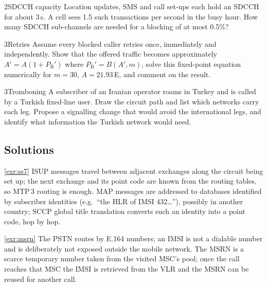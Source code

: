\documentclass[11pt,a4paper]{article}
\begin{document}
\begin{exercisebox}{2}{SDCCH capacity}\label{exr:sdcch}
Location updates, SMS and call set-ups each hold an SDCCH for about 3\,s. A cell sees 1.5
such transactions per second in the busy hour. How many SDCCH sub-channels are needed for
a blocking of at most 0.5\%?
\end{exercisebox}

\begin{exercisebox}{3}{Retries}\label{exr:retry}
Assume every blocked caller retries once, immediately and independently. Show that the
offered traffic becomes approximately $A' = A(1+P_{\mathrm{B}}')$ where
$P_{\mathrm{B}}' = B(A',m)$, solve this fixed-point equation numerically for $m = 30$,
$A = 21.93$\,E, and comment on the result.
\end{exercisebox}

\begin{exercisebox}{3}{Tromboning}\label{exr:trombone}
A subscriber of an Iranian operator roams in Turkey and is called by a Turkish fixed-line
user. Draw the circuit path and list which networks carry each leg. Propose a signalling
change that would avoid the international legs, and identify what information the
Turkish network would need.
\end{exercisebox}

\subsection*{Solutions}

\begin{solutionbox}{\ref{exr:ss7}}
ISUP messages travel between adjacent exchanges along the circuit being set up; the next
exchange and its point code are known from the routing tables, so MTP\,3 routing is
enough. MAP messages are addressed to databases identified by subscriber identities (e.g.\
``the HLR of IMSI 432\ldots''), possibly in another country; SCCP global title translation
converts such an identity into a point code, hop by hop.
\end{solutionbox}

\begin{solutionbox}{\ref{exr:msrn}}
The PSTN routes by E.164 numbers; an IMSI is not a dialable number and is deliberately not
exposed outside the mobile network. The MSRN is a scarce temporary number taken from the
visited MSC's pool; once the call reaches that MSC the IMSI is retrieved from the VLR and
the MSRN can be reused for another call.
\end{solutionbox}
\end{document}
